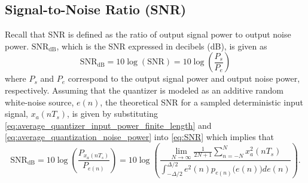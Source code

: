 \subsection{Signal-to-Noise Ratio (SNR)}
Recall that SNR is defined as the ratio of output signal power to output noise power. 
$\text{SNR}_{\text{dB}}$, which is the SNR expressed in decibels (dB), is given as
\begin{equation}\label{eq:SNR}
 \text{SNR}_{\text{dB}}
=10\log\left(\text{SNR}\right)=10\log\left(\frac{P_s}{P_e}
\right)
\end{equation}
where $P_s$ and $P_e$ correspond to the output signal power and output noise power,
respectively. Assuming that the quantizer is modeled as an additive random white-noise
source, $e(n)$, the theoretical SNR for a sampled deterministic input signal, $x_a(nT_s)$,
 is given by substituting \eqref{eq:average_quantizer_input_power_finite_length} and
\eqref{eq:average_quantization_noise_power} into \eqref{eq:SNR} which implies that
\begin{equation}\label{eq:SNR_2}
 \text{SNR}_{\text{dB}}=10\log\left(\frac{P_{x_a(nT_s)}}{P_{e(n)}}\right)
=10\log\left(\frac{\displaystyle\lim_{N\to\infty}\frac{1}{2N+1}\displaystyle\sum_{n=-N}^{N
} x_a^2(nT_s) } { \displaystyle\int_ { -\Delta/2}^{\Delta/2}e^2(n)p_ { e(n)
}\bigl(e(n)\bigr) de(n)}\right)\text{.}
\end{equation}

